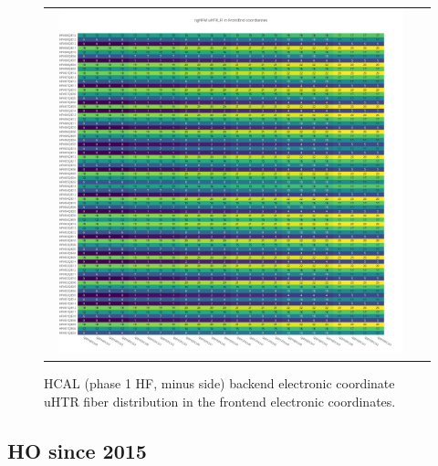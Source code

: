 \begin{figure}[htb]
 \begin{center}
  \begin{tabular}{cc}
   \includegraphics[angle=0,width=0.95\textwidth]{figures/appendix/ngHFM_uHTR_FI_in_FrontEnd.png}
  \end{tabular}
  \caption{HCAL (phase 1 HF, minus side) backend electronic coordinate uHTR fiber distribution in the frontend electronic coordinates.}
  \label{fig:lmapngHFMuHTRFIFEC}
 \end{center}
\end{figure}
\clearpage

\subsection{HO since 2015}
\clearpage

